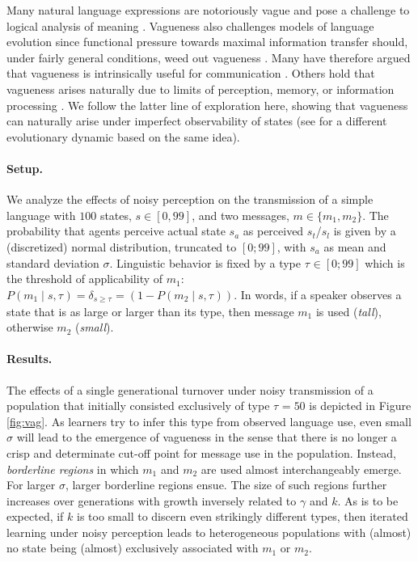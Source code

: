 \documentclass[10pt,a4paper]{article}
\newcommand{\type}[1]{\ensuremath{\tau_{#1}}}
\newcommand{\postparameter}{\ensuremath{\gamma}}
\begin{document}
Many natural language expressions are notoriously vague and pose a challenge to logical
analysis of meaning \citep[e.g.][]{Williamson1994:Vagueness}. Vagueness also challenges models
of language evolution since functional pressure towards maximal information transfer should,
under fairly general conditions, weed out vagueness \citep{Lipman2009:Why-is-Language}. Many
have therefore argued that vagueness is intrinsically useful for communication
\citep[e.g.][]{Deemter2009:Utility-and-Lan,Jaegherde-JaegherRooijvan-Rooij2010:Strategic-Vague,BlumeBoard2013:Intentional-Vag}. Others
hold that vagueness arises naturally due to limits of perception, memory, or information
processing
\citep[e.g.][]{FrankeJager2010:Vagueness-Signa,OConnor2013:The-Evolution-o,LassiterGoodman2015:Adjectival-vagu}. We
follow the latter line of exploration here, showing that vagueness can naturally arise under
imperfect observability of states (see \cite{franke+correia:toappear} for a different
evolutionary dynamic based on the same idea).

\paragraph{Setup.}  We analyze the effects of noisy perception on the transmission of a simple
language with $100$ states, $s \in [0,99]$, and two messages, $m \in \{m_1,m_2\}$. The
probability that agents perceive actual state $s_a$ as perceived $s_t$/$s_l$ is given by a (discretized) normal
distribution, truncated to $[0;99]$, with $s_a$ as mean and standard deviation
$\sigma$. %
Linguistic behavior is fixed by a type $\type{} \in [0;99]$ which is the threshold of applicability
of $m_1$: $P(m_1 \mid s,\type{}) = \delta_{s \ge \type{}} = (1 - P(m_2 \mid s,\type{}))$. In words, if a speaker observes a
state that is as large or larger than its type, then message $m_1$ is
used (\emph{tall}), otherwise $m_2$ ({\em small}).

\paragraph{Results.} The effects of a single generational turnover under noisy transmission of a population that initially consisted exclusively of type $\type{} = 50$ is
depicted in Figure \ref{fig:vag}. As learners try to infer this type from observed language use, even small $\sigma$ will lead to
the emergence of vagueness in the sense that there is no longer a crisp and determinate cut-off
point for message use in the population. Instead, \emph{borderline regions} in which $m_1$ and $m_2$
are used almost interchangeably emerge. For larger $\sigma$, larger borderline regions ensue. The size
of such regions further increases over generations with growth inversely related to $\postparameter$
and $k$. As is to be expected, if $k$ is too small to discern even strikingly different types,
then iterated learning under noisy perception leads to heterogeneous populations with (almost)
no state being (almost) exclusively associated with $m_1$ or $m_2$.
\end{document}
